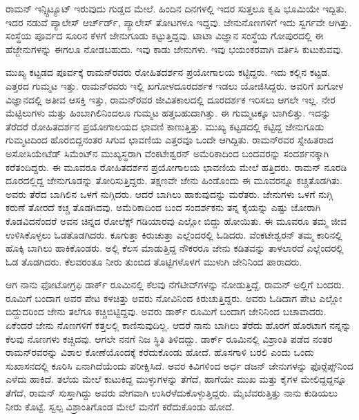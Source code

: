 
ರಾಮನ್ ಇನ್ಸ್ಟಿಟ್ಯೂಟ್ ಇರುವುದು ಗುಡ್ಡದ ಮೇಲೆ. ಹಿಂದಿನ ದಿನಗಳಲ್ಲಿ ಇದರ ಸುತ್ತಲೂ ಕೃಷಿ ಭೂಮಿಯೇ ಇದ್ದಿತು. ಇದರ ನಡುವೆ ಪ್ಯಾಲೇಸ್ ಆರ್ಚ್‌ರ್ಡ್, ಪ್ಯಾಲೇಸ್ ತೋಟಗಳೂ ಇದ್ದವು. ಜೇನುನೊಣಗಳಿಗೆ ಇದು ಸ್ವರ್ಗವೇ ಆಗಿತ್ತು. ಸಂಸ್ಥೆಯ ಪೂರ್ವದ ಸೂರಿನ ಕೆಳಗೆ ಜೇನುಗೂಡು ಕಟ್ಟುತ್ತಿದ್ದವು. ಟಾಟಾ ವಿಜ್ಞಾನ ಸಂಸ್ಥೆಯ ಗೋಪುರದಲ್ಲಿ ಈ ಹೆಜ್ಜೇನುಗಳನ್ನು ಈಗಲೂ ನೋಡಬಹುದು. ಇವು ಕಾಡು ಜೇನುಗಳು. ಇವು ಭಯಂಕರವಾಗಿ ವರ್ತಿಸಿ ಕುಟುಕುವವು.

ಮುಖ್ಯ ಕಟ್ಟಡದ ಪೂರ್ವಕ್ಕೆ ರಾಮನ್‍ರವರು ರೋಹಿತದರ್ಶನ ಪ್ರಯೋಗಾಲಯ ಕಟ್ಟಿದ್ದರು. ಇದು ಕಲ್ಲಿನ ಕಟ್ಟಡ. ಎತ್ತರದ ಗುಮ್ಮಟ ಇತ್ತು. ರಾಮನ್‍ರವರು ಇಲ್ಲಿ ಖಗೋಳದೂರದರ್ಶಕ ಇಡಲು ಯೋಜಿಸಿದ್ದರು. ಅವರಿಗೆ ಖಗೋಳ ವಿಜ್ಞಾನದಲ್ಲಿ ಅತೀವ ಆಸಕ್ತಿ ಇತ್ತು, ರಾಮನ್‍ರವರ ಜೀವಿತಕಾಲದಲ್ಲಿ ದೂರದರ್ಶಕ ಇರಿಸಲು ಆಗಲೇ ಇಲ್ಲ. ನೇರ ಮೆಟ್ಟಿಲುಗಳು ಮತ್ತು ಹಿಂಬಾಗಿಲಿನಿಂದಲೂ ಗುಮ್ಮಟ ಹತ್ತಬಹುದಾಗಿತ್ತು. ಈ ಗುಮ್ಮಟಕ್ಕೂ ಬಾಗಿಲಿತ್ತು. ಇದನ್ನು ತೆರೆದರೆ ರೋಹಿತದರ್ಶನ ಪ್ರಯೋಗಾಲಯದ ಛಾವಣಿ ಕಾಣುತ್ತಿತ್ತು. ಮುಖ್ಯ ಕಟ್ಟಡದಲ್ಲಿ ಕಟ್ಟಿದ್ದ ಜೇನುಗೂಡು ಗುಮ್ಮಟದಿಂದ ಹೊರಬಿದ್ದನಂತರ ಸಿಗುವ ಛಾವಣಿಯ ಎತ್ತರವೂ ಒಂದೇ ಆಗಿದ್ದಿತು. ರಾಮನ್‍ರವರ ಸ್ನೇಹಿತರಾದ ಅಸೋಸಿಯೇಟೆಡ್ ಸಿಮೆಂಟ್‍ನ ಮುಖ್ಯಸ್ಥರಾಗಿ ವೆಂಕಟೇಶ್ವರನ್ ಅಮೆರಿಕಾದಿಂದ ಬಂದವರನ್ನು ಸಂದರ್ಶನಕ್ಕಾಗಿ ಕರೆತಂದಿದ್ದರು. ಈ ಮೂವರೂ ರೋಹಿತದರ್ಶನ ಪ್ರಯೋಗಾಲಯ ಛಾವಣಿಯ ಮೇಲೆ ಹತ್ತಿದರು. ರಾಮನ್ ನೂರಡಿ ದೂರದಲ್ಲಿದ್ದ ಜೇನುಗೂಡನ್ನು ತೋರಿಸುತ್ತಿದ್ದರು. ತಕ್ಷಣವೇ ಜೇನು ಹಿಂಡೊಂದು ಈ ಮೂವರನ್ನೂ ಕಚ್ಚತೊಡಗಿತು. ಅವರು ತೆರೆದ ಬಾಗಿಲಿನ ಒಳಗೆ ನುಗ್ಗಿದರು. ಆದರೆ ಬಾಗಿಲು ಹಾಕುವುದನ್ನು ಮರೆತರು. ಜೇನುಗಳು ಒಳಗೆ ನುಗ್ಗಿ ಕರುಣೆ ತೋರದೆ ಕಚ್ಚ ತೊಡಗಿದವು. ಅಮೆರಿಕಾದಿಂದ ಬಂದ ಸಂದರ್ಶಕನು ತನ್ನ ಕೈಯನ್ನು ಎಷ್ಟು ಜೋರಾಗಿ ಕೊಡವಿದನೆಂದರೆ ಅವನ ಚಿನ್ನದ ರೋಲೆಕ್ಸ್ ಗಡಿಯಾರವು ಎಲ್ಲೋ ಬಿದ್ದು ಹೋಯಿತು. ಈ ಮೂವರೂ ತಮ್ಮ ಜೀವ ಉಳಿಸಿಕೊಳ್ಳಲು ಓಡತೊಡಗಿದರು. ಕೂಗುತ್ತಾ ಕಿರುಚುತ್ತಾ ಎಲ್ಲೆಂದರಲ್ಲಿ ಓಡಿದರು. ವೆಂಕಟೇಶ್ವರನ್ ತಮ್ಮ ಕಾರಿನಲ್ಲಿ ಹೊಕ್ಕಿ ಬಾಗಿಲು ಹಾಕಿಕೊಂಡರು. ಅಲ್ಲಿ ಕೆಲಸ ಮಾಡುತ್ತಿದ್ದ ನೌಕರರೂ ಜೇನು ಕಡಿತವನ್ನು ತಾಳಲಾರದೆ ಎಲ್ಲೆಂದರಲ್ಲಿ ಓಡ ತೊಡಗಿದರು. ಕೆಲವರಂತೂ ನೀರು ತುಂಬಿದ ತೊಟ್ಟಿಗಳೊಳಗೆ ಮುಳುಗಿ ಜೇನಿನಿಂದ ಪಾರಾದರು.

ಆಗ ನಾನು ಫೋಟೋಗ್ರಫಿ ಡಾರ್ಕ್ ರೂಮಿನಲ್ಲಿ ಕೆಲವು ನೆಗೆಟೀವ್‍ಗಳನ್ನು ನೋಡುತ್ತಿದ್ದೆ, ರಾಮನ್ ಅಲ್ಲಿಗೆ ಬಂದರು. ರೂಮಿಗೆ ಬಂದಾಗ ಅವರ ಪೇಟ ಕಳಚಿತ್ತು ಅವರು ನೋವಿನಿಂದ ಕಿರುಚುತ್ತಿದ್ದರು. ಅವರು ಓಡಿದಾಗ ಪೇಟ ಎಲ್ಲೋ ಬಿದ್ದುದರಿಂದ ಜೇನು ತಲೆಗೂ ಕಚ್ಚಿಬಿಟ್ಟಿದ್ದವು. ಅವರು ಡಾರ್ಕ್ ರೂಮಿಗೆ ಬಂದಾಗ ಜೇನಿನಿಂದ ಬಚಾವಾದರು. ಏಕೆಂದರೆ ಜೇನು ನೊಣಗಳಿಗೆ ಕತ್ತಲಲ್ಲಿ ಕಾಣಿಸುವುದಿಲ್ಲ. ಆದರೆ ನಾನು ಬಾಗಿಲು ತೆರೆದು ಹೊರಗೆ ಹೊರಟಾಗ ನನ್ನನ್ನು ಕೆಲವು ನೊಣಗಳು ಕಚ್ಚಿದವು. ಆಗಲೇ ನನಗೆ ನಿಜ ಸ್ಥಿತಿ ತಿಳಿದದ್ದು. ಡಾರ್ಕ್ ರೂಮಿನಲ್ಲಿ ವಿಶ್ರಾಂತಿ ಪಡೆದ ನಂತರ ರಾಮನ್‍ರವರನ್ನು ವಿಶಾಲ ಕೋಣೆಯೊಂದಕ್ಕೆ ಕರೆದುಕೊಂಡು ಹೋದೆ. ಹೊಸಗಾಳಿ ಬರಲಿ ಎಂದು ಒಂದು ಸುಖಾಸನದಲ್ಲಿ ಕೂರಿಸಿ ಏನಾಗಿದೆಯೆಂದು ಪರೀಕ್ಷಿಸಿದೆ. ಅವರ ಕಿವಿಗಳಿಂದ ಅರ್ಧ ಡಜನ್ ಜೇನುಗಳನ್ನು ಫೊರ್‍ಸೆಪ್ಸ್‌ನಿಂದ ಎಳೆದು ಹಾಕಿದೆ. ತಲೆಯ ಮೇಲೆ ಕುಟುಕಿದ್ದ ಮುಳ್ಳುಗಳನ್ನು ತೆಗೆದೆ, ಹಾಗೆಯೇ ಮುಖ ಮತ್ತು ಕೈಗಳ ಮೇಲಿದ್ದದ್ದನ್ನೂ ತೆಗೆದೆ, ರಾಮನ್ ಸುಸ್ತಾಗಿದ್ದು ಅವರು ವೇಗವಾಗಿ ಉಸಿರೆಳೆದುಕೊಳ್ಳುತ್ತಿದ್ದರು. ಮೈಬೆವರುತ್ತಿತ್ತು ನಾನು ಕುಡಿಯಲು ನೀರು ಕೊಟ್ಟೆ. ಸ್ವಲ್ಪ ವಿಶ್ರಾಂತಿಗೊಂಡ ಮೇಲೆ ಮನೆಗೆ ಕರೆದುಕೊಂಡು ಹೋದೆ.

